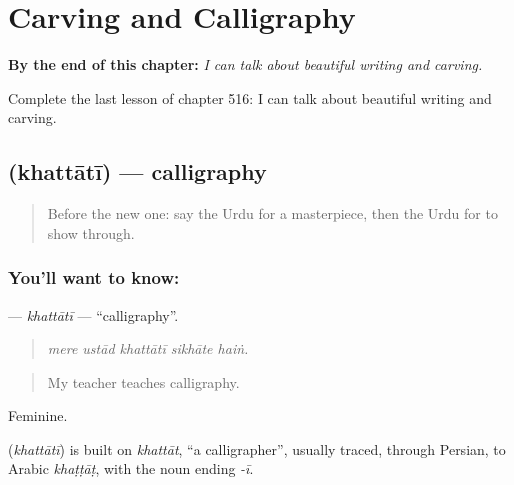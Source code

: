 
\chapter{Carving and Calligraphy}
\label{ch:ur-carving-and-calligraphy}

\begin{chapteropening}
\textbf{By the end of this chapter:} \emph{I can talk about beautiful writing and carving.}

Complete the last lesson of chapter 516: I can talk about beautiful writing and carving.
\end{chapteropening}

\section[\texorpdfstring{\ur{خطاطی} (khattātī)}{خطاطی (khattātī)}]{ (khattātī) — calligraphy}

\label{lesson:UR-C516-khattati}



\begin{quote}
Before the new one: say the Urdu for a masterpiece, then the Urdu for to show through.
\end{quote}

\subsection*{You'll want to know: }
\textbf{} — \emph{khattātī} — \textquotedblleft{}calligraphy\textquotedblright{}.

\begin{quote}
    
\end{quote}

\begin{quote}
\emph{mere ustād khattātī sikhāte haiṅ.}
\end{quote}

\begin{quote}
My teacher teaches calligraphy.
\end{quote}

Feminine.

\begin{cousinweb}
\textbf{} (\emph{khattātī}) is built on \emph{khattāt}, \textquotedblleft{}a calligrapher\textquotedblright{}, usually traced, through Persian, to Arabic \emph{khaṭṭāṭ}, with the noun ending \emph{-ī}.
\end{cousinweb}

